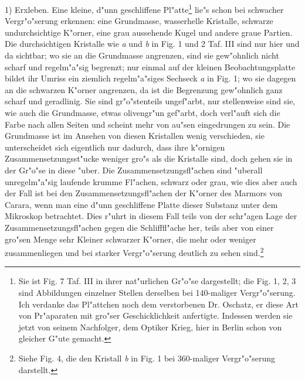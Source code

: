 \documentclass[a4paper, 11pt, oneside]{article}
\begin{document}
1) Erxleben. Eine kleine, d"unn geschliffene Pl"atte\footnote{Sie ist Fig. 7 Taf. III in ihrer nat"urlichen Gr"o"se dargestellt; die Fig. 1, 2, 3 sind Abbildungen einzelner Stellen derselben bei 140-maliger Vergr"o"serung. Ich verdanke das Pl"attchen noch dem verstorbenen Dr. Oschatz, er diese Art von Pr"aparaten mit gro"ser Geschicklichkeit anfertigte. Indessen werden sie jetzt von seinem Nachfolger, dem Optiker Krieg, hier in Berlin schon von gleicher G"ute gemacht.} lie"s schon bei schwacher Vergr"o"serung erkennen: eine Grundmasse, wasserhelle Kristalle, schwarze undurchsichtige K"orner, eine grau aussehende Kugel und andere graue Partien. Die durchsichtigen Kristalle wie \emph{a} und \emph{b} in Fig. 1 und 2 Taf. III sind nur hier und da sichtbar; wo sie an die Grundmasse angrenzen, sind sie gew"ohnlich nicht scharf und regelm"a"sig begrenzt; nur einmal auf der kleinen Beobachtungsplatte bildet ihr Umriss ein ziemlich regelm"a"siges Sechseck \emph{a} in Fig. 1; wo sie dagegen an die schwarzen K"orner angrenzen, da ist die Begrenzung gew"ohnlich ganz scharf und geradlinig. Sie sind gr"o"stenteils ungef"arbt, nur stellenweise sind sie, wie auch die Grundmasse, etwas olivengr"un gef"arbt, doch verl"auft sich die Farbe nach allen Seiten und scheint mehr von au"sen eingedrungen zu sein. Die Grundmasse ist im Ansehen von diesen Kristallen wenig verschieden, sie unterscheidet sich eigentlich nur dadurch, dass ihre k"ornigen Zusammensetzungsst"ucke weniger gro"s als die Kristalle sind, doch gehen sie in der Gr"o"se in diese "uber. Die Zusammensetzungsfl"achen sind "uberall unregelm"a"sig laufende krumme Fl"achen, schwarz oder grau, wie dies aber auch der Fall ist bei den Zusammensetzungsfl"achen der K"orner des Marmors von Carara, wenn man eine d"unn geschliffene Platte dieser Substanz unter dem Mikroskop betrachtet. Dies r"uhrt in diesem Fall teils von der schr"agen Lage der Zusammensetzungsfl"achen gegen die Schlifffl"ache her, teils aber von einer gro"sen Menge sehr Kleiner schwarzer K"orner, die mehr oder weniger zusammenliegen und bei starker Vergr"o"serung deutlich zu sehen sind.\footnote{Siehe Fig. 4, die den Kristall \emph{b} in Fig. 1 bei 360-maliger Vergr"o"serung darstellt.}
\end{document}
